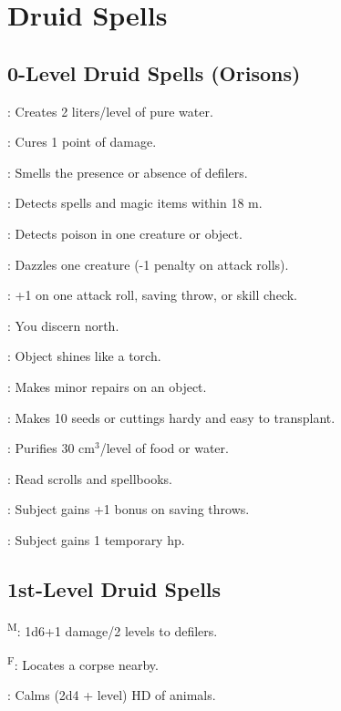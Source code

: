 \section{Druid Spells}



\subsection{0-Level Druid Spells (Orisons)}

: Creates 2 liters/level of pure water.

: Cures 1 point of damage.

: Smells the presence or absence of defilers.

: Detects spells and magic items within 18 m.

: Detects poison in one creature or object.

: Dazzles one creature (-1 penalty on attack rolls).

: +1 on one attack roll, saving throw, or skill check.

: You discern north.

: Object shines like a torch.

: Makes minor repairs on an object.

: Makes 10 seeds or cuttings hardy and easy to transplant.

: Purifies 30 cm$^3$/level of food or water.

: Read scrolls and spellbooks.

: Subject gains +1 bonus on saving throws.

: Subject gains 1 temporary hp.



\subsection{1st-Level Druid Spells}

\textsuperscript{M}: 1d6+1 damage/2 levels to defilers.

\textsuperscript{F}: Locates a corpse nearby.

: Calms (2d4 + level) HD of animals.

